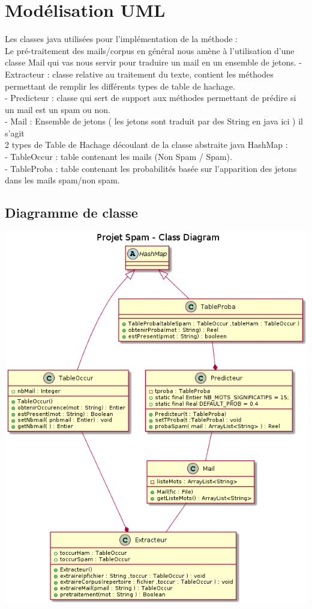 \documentclass{article}
\begin{document}
\clearpage

\section{Modélisation UML}

Les classes java utilisées pour l'implémentation de la méthode : \\
Le pré-traitement des mails/corpus en général nous amène à l'utilisation d'une classe Mail qui vas nous servir pour traduire un mail en un ensemble de jetons.
- Extracteur : classe relative au traitement du texte, contient les méthodes permettant de remplir les différents types de table de hachage. \\
- Predicteur : classe qui sert de support aux méthodes permettant de prédire si un mail est un spam ou non. \\
- Mail : Ensemble de jetons ( les jetons sont traduit par des String en java ici ) il s'agit \\

2 types de Table de Hachage découlant de la classe abstraite java HashMap :\\
- TableOccur : table contenant les mails (Non Spam / Spam).\\
- TableProba : table contenant les probabilités basée sur l'apparition des jetons dans les mails spam/non spam.\\

\subsection{Diagramme de classe}

\includegraphics[scale=0.5]{diag_classe.png}
\end{document}
